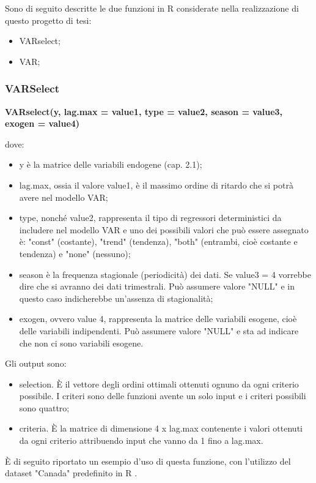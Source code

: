 \documentclass[12pt,a4paper,twoside,openright]{book}
\begin{document}
Sono di seguito descritte le due funzioni in R considerate nella realizzazione di questo progetto di tesi:
\begin{itemize}
\item VARselect;
\item VAR;
\end{itemize}
\newpage
\subsubsection{VARSelect}
\begin{center}
{\bfseries 
VARselect(y, lag.max = value1, type = value2, season = value3, exogen = value4)
}
\end{center}
dove:
\begin{itemize}
\item y è la matrice delle variabili endogene (cap. 2.1);
\item lag.max, ossia il valore value1, è il massimo ordine di ritardo che si potrà avere nel modello VAR;
\item type, nonché value2, rappresenta il tipo di regressori deterministici da includere nel modello VAR e uno dei possibili valori che può essere assegnato è: "const" (costante), "trend" (tendenza), "both" (entrambi, cioè costante e tendenza) e "none" (nessuno);
\item season è la frequenza stagionale (periodicità) dei dati. Se value3 = 4 vorrebbe dire che si avranno dei dati trimestrali. Può assumere valore "NULL" e in questo caso indicherebbe un'assenza di stagionalità;
\item exogen, ovvero value 4, rappresenta la matrice delle variabili esogene, cioè delle variabili indipendenti. Può assumere valore "NULL" e sta ad indicare che non ci sono variabili esogene.
\end{itemize}

Gli output sono:
\begin{itemize}
\item selection. È il vettore degli ordini ottimali ottenuti ognuno da ogni criterio possibile. I criteri sono delle funzioni avente un solo input e i criteri possibili sono quattro;
\item criteria. È la matrice di dimensione 4 x lag.max contenente i valori ottenuti da ogni criterio attribuendo input che vanno da 1 fino a lag.max.
\end{itemize}
\newpage
È di seguito riportato un esempio d'uso di questa funzione, con l'utilizzo del dataset "Canada" predefinito in R \cite{20a}.
\end{document}
